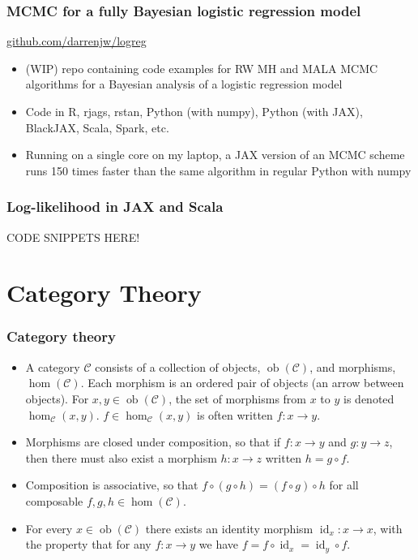 \documentclass[mathserif,handout]{beamer}
\begin{document}
\begin{frame}
  \frametitle{MCMC for a fully Bayesian logistic regression model}
  \centerline{\alert{\url{github.com/darrenjw/logreg}}}
  \begin{itemize}
  \item (WIP) repo containing code examples for RW MH and MALA MCMC algorithms for a Bayesian analysis of a logistic regression model
  \item Code in R, rjags, rstan, Python (with numpy), Python (with JAX), BlackJAX, Scala, Spark, etc.
    \item Running on a single core on my laptop, a JAX version of an MCMC scheme runs 150 times faster than the same algorithm in regular Python with numpy
  \end{itemize}
\end{frame}

\begin{frame}
  \frametitle{Log-likelihood in JAX and Scala}

  CODE SNIPPETS HERE!
  
\end{frame}


\section{Category Theory}

\begin{frame}[fragile]
  \frametitle{Category theory}
  \begin{itemize}
  \item A category $\mathcal{C}$ consists of a collection of \alert{objects}, $\operatorname{ob}(\mathcal{C})$, and \alert{morphisms}, $\operatorname{hom}(\mathcal{C})$. Each morphism is an ordered pair of objects (an arrow between objects). For $x,y\in \operatorname{ob}(\mathcal{C})$, the set of morphisms from $x$ to $y$ is denoted $\operatorname{hom}_{\mathcal{C}}(x,y)$. $f\in \operatorname{hom}_{\mathcal{C}}(x,y)$ is often written $f: x \longrightarrow y$.
  \item Morphisms are closed under \alert{composition}, so that if $f: x\longrightarrow y$ and $g: y\longrightarrow z$, then there must also exist a morphism $h: x\longrightarrow z$ written $h=g \circ f$.
  \item Composition is associative, so that $f\circ(g\circ h) = (f\circ g)\circ h$ for all composable $f, g, h\in \operatorname{hom}(\mathcal{C})$.
    \item For every $x\in \operatorname{ob}(\mathcal{C})$ there exists an \alert{identity} morphism $\operatorname{id}_x: x\longrightarrow x$, with the property that for any $f: x\longrightarrow y$ we have $f = f\circ \operatorname{id}_x = \operatorname{id}_y\circ f$.
  \end{itemize}
\end{frame}
\end{document}
